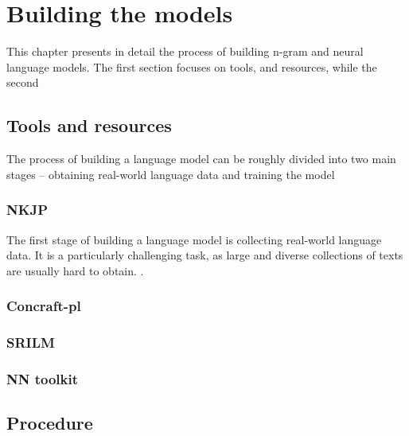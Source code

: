 \chapter{Building the models}
This chapter presents in detail the process of building n-gram and neural language models. The first section focuses on tools, and resources, while the second 
\label{chapter:tools}
\section{Tools and resources}
The process of building a language model can be roughly divided into two main stages -- obtaining real-world language data and training the model
\subsection{NKJP}
\label{section:nkjp}
The first stage of building a language model is collecting real-world language data. It is a particularly challenging task, as large and diverse collections of texts are usually hard to obtain. .
\subsection{Concraft-pl}
\subsection{SRILM}
\subsection{NN toolkit}
\section{Procedure}




